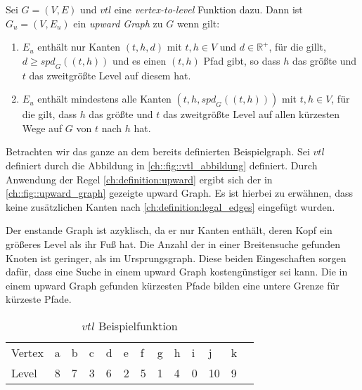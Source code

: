 \begin{definition}
    Sei $G = (V, E)$ und ${vtl}$ eine \emph{vertex-to-level} Funktion dazu. Dann ist $G_u = (V, E_u)$ ein \emph{upward Graph} zu $G$ wenn gilt:
    \begin{enumerate}
        \item\label{ch:definition:legal_edges}
        $E_u$ enthält nur Kanten $(t, h, d)$ mit $t, h \in V$ und $d \in \mathbb{R}^+$, für die gillt, $d \geq {spd}_{G}((t, h))$ und es einen $(t, h)$ Pfad gibt, so dass $h$ das größte und $t$ das zweitgrößte Level auf diesem hat.

        \item\label{ch:definition:upward}
        $E_u$ enthält mindestens alle Kanten $(t, h, {spd}_{G}((t, h)))$ mit $t, h \in V$, für die gilt, dass $h$ das größte und $t$ das zweitgrößte Level auf allen kürzesten Wege auf $G$ von $t$ nach $h$ hat.
    \end{enumerate}
\end{definition}


Betrachten wir das ganze an dem bereits definierten Beispielgraph.
Sei ${vtl}$ definiert durch die Abbildung in \autoref{ch::fig::vtl_abbildung} definiert.
Durch Anwendung der Regel \ref{ch:definition:upward} ergibt sich der in \autoref{ch::fig::upward_graph} gezeigte upward Graph.
Es ist hierbei zu erwähnen, dass keine zusätzlichen Kanten nach \autoref{ch:definition:legal_edges} eingefügt wurden.

Der enstande Graph ist azyklisch, da er nur Kanten enthält, deren Kopf ein größeres Level als ihr Fuß hat.
Die Anzahl der in einer Breitensuche gefunden Knoten ist geringer, als im Ursprungsgraph.
Diese beiden Eingeschaften sorgen dafür, dass eine Suche in einem upward Graph kostengünstiger sei kann.
Die in einem upward Graph gefunden kürzesten Pfade bilden eine untere Grenze für kürzeste Pfade.

\begin{table}[ht]
    \centering
    \begin{tabular}{lllllllllllll}
        Vertex & a & b & c & d & e & f & g & h & i & j  & k & \\
        Level  & 8 & 7 & 3 & 6 & 2 & 5 & 1 & 4 & 0 & 10 & 9 &
    \end{tabular}
    \caption{${vtl}$ Beispielfunktion}
    \label{ch::fig::vtl_abbildung}
\end{table}


